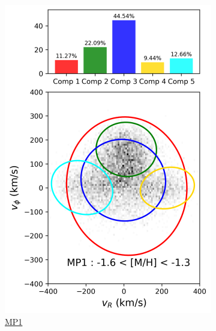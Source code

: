 \documentclass[a4paper,10pt]{article}
\begin{document}
\begin{multicols}{2}
\begin{figure}[H]
\begin{subfigure}[t]{0.24\linewidth}
    \includegraphics[width=\linewidth]{../figures/gmm_MP1.png}
    \caption{\href{https://raw.githack.com/raunaq-rai/Disentangling-the-Milky-Way-using-GMM/main/figures/MP1\_\_-1.6\%5BM\_H\%5D-1.3.html}{MP1}}
    \label{fig:gmm_mp1}
  \end{subfigure}\hfill
  \begin{subfigure}[t]{0.24\linewidth}

\end{subfigure}
\end{figure}
\end{multicols}
\end{document}
